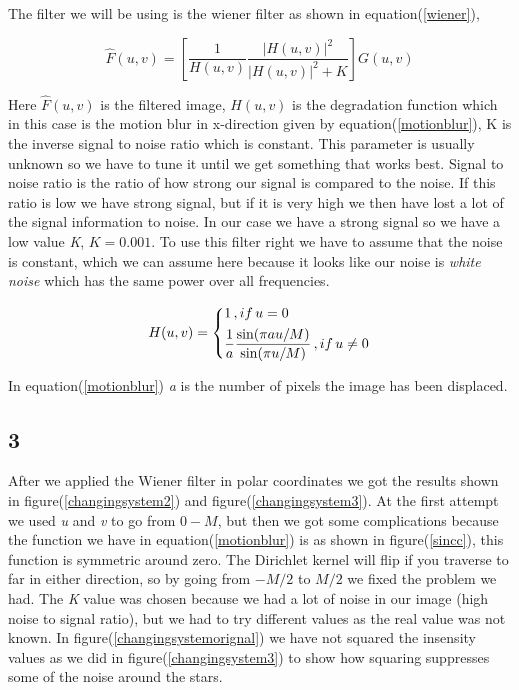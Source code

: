 {The filter we will be using is the wiener filter as shown in equation(\ref{wiener}),

\begin{equation}
    \hat{F}(u,v) = \left[\frac{1}{H(u,v)}\frac{|H(u,v)|^{2}}{|H(u,v)|^{2} + K}\right]G(u,v)
    \label{wiener}
\end{equation}

Here $\hat{F}(u,v)$ is the filtered image, $H(u,v)$ is the degradation function which in this case is the motion blur in x-direction given by equation(\ref{motionblur}), K is the inverse signal to noise ratio which is constant. This parameter is usually unknown so we have to tune it until we get something that works best. Signal to noise ratio is the ratio of how strong our signal is compared to the noise. If this ratio is low we have strong signal, but if it is very high we then have lost a lot of the signal information to noise. In our case we have a strong signal so we have a low value \emph{K}, $K = 0.001$. To use this filter right we have to assume that the noise is constant, which we can assume here because it looks like our noise is \emph{white noise} which has the same power over all frequencies.

\begin{equation}
    H(u,v) =     \begin{dcases}
        1\, , if \,u = 0\\
        \frac{1}{a}\frac{\sin(\pi a u/M)}{\sin(\pi u /M)}\, , if \, u \neq 0\\
    \end{dcases}
    \label{motionblur}
\end{equation}

In equation(\ref{motionblur}) \emph{a} is the number of pixels the image has been displaced. 


\subsection{3}


After we applied the Wiener filter in polar coordinates we got the results shown in figure(\ref{changingsystem2}) and figure(\ref{changingsystem3}). At the first attempt we used \emph{u} and \emph{v} to go from $0-M$, but then we got some complications because the function we have in equation(\ref{motionblur}) is as shown in figure(\ref{sincc}), this function is symmetric around zero. The Dirichlet kernel will flip if you traverse to far in either direction, so by going from $-M/2$ to $M/2$ we fixed the problem we had. The \emph{K} value was chosen because we had a lot of noise in our image (high noise to signal ratio), but we had to try different values as the real value was not known. In figure(\ref{changingsystemorignal}) we have not squared the insensity values as we did in figure(\ref{changingsystem3}) to show how squaring suppresses some of the noise around the stars.


}
